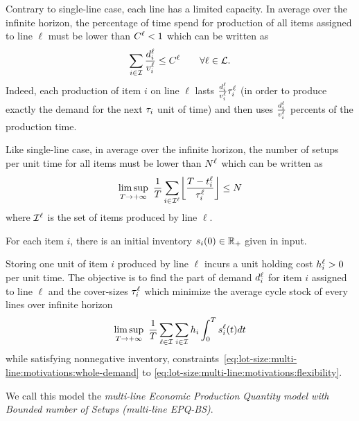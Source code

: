 Contrary to single-line case, each line has a limited capacity.
In average over the infinite horizon, the percentage of time spend for production of all items assigned to line $\ell$ must be lower than $C^{\ell}<1$ which can be written as
\begin{equation}\label{eq:lot-size:multi-line:motivations:capacity}
  \sum_{i\in\mathcal{I}}\frac{d_i^{\ell}}{v_i^{\ell}}\le C^{\ell}\qquad\forall \ell\in\mathcal{L}.
\end{equation}
Indeed, each production of item $i$ on line $\ell$ lasts $\frac{d_i^{\ell}}{v_i^{\ell}}\tau_i^{\ell}$ (in order to produce exactly the demand for the next $\tau_i$ unit of time) and then uses $\frac{d_i^{\ell}}{v_i^{\ell}}$ percents of the production time.


Like single-line case, in average over the infinite horizon, the number of setups per unit time for all items must be lower than $N^{\ell}$ which can be written as
\begin{equation}\label{eq:lot-size:multi-line:motivations:flexibility}
  \limsup_{\horizon\rightarrow+\infty}\ \frac{1}{\horizon} \sum_{i\in\REF^{\ell}} \left\lfloor\frac{\horizon-t_i^{\ell}}{\cover_i^{\ell}}\right\rfloor \le \nbsetups
\end{equation}
where $\mathcal{I}^{\ell}$ is the set of items produced by line $\ell$.


For each item $i$, there is an initial inventory $\inventory_i\bracket{0}\in\RR_+$ given in input.


Storing one unit of item $i$ produced by line $\ell$ incurs a unit holding cost $h_i^{\ell}>0$ per unit time.
The objective is to find the part of demand $d_i^{\ell}$ for item $i$ assigned to line $\ell$ and the cover-sizes $\tau_i^{\ell}$ which minimize the average cycle stock of every lines over infinite horizon
\begin{equation}
  \limsup_{\horizon\rightarrow+\infty}\ \frac{1}{\horizon} \sum_{\ell\in\REF} \sum_{i\in\REF} \holding_i \int_0^{\horizon}\inventory_i^{\ell}\bracket{t}dt
\end{equation}
while satisfying nonnegative inventory, constraints~\eqref{eq:lot-size:multi-line:motivations:whole-demand} to \eqref{eq:lot-size:multi-line:motivations:flexibility}.

\medskip


We call this model the \emph{multi-line Economic Production Quantity model with Bounded number of Setups (multi-line EPQ-BS)}.


